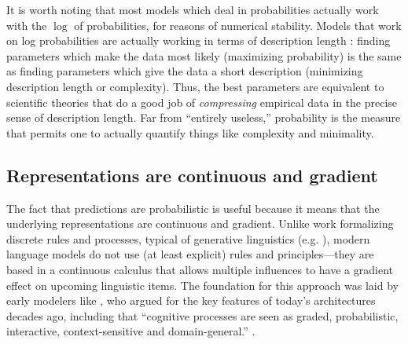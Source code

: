 \documentclass[output=paper,colorlinks,citecolor=brown
]{langscibook}
\begin{document}
It is worth noting that most models which deal in probabilities actually work with the $\log$ of probabilities, for reasons of numerical stability. Models that work on log probabilities are actually working in terms of description length \citep{shannon1948mathematical,cover1999elements}: finding parameters which make the data most likely (maximizing probability) is the same as finding parameters which give the data a short description (minimizing description length or complexity). Thus, the best parameters are equivalent to scientific theories that do a good job of \emph{compressing} empirical data in the precise sense of description length. Far from ``entirely useless,'' probability is the measure that permits one to actually quantify things like complexity and minimality. 

\subsection{Representations are continuous and gradient}

The fact that predictions are probabilistic is useful because it means that the underlying representations are continuous and gradient. Unlike work formalizing discrete rules and processes, typical of generative linguistics (e.g. \cite{chomsky1956three,chomsky1995minimalist,collins2016formalization,chomsky1957syntactic,pinker1988language}), modern language models do not use (at least explicit) rules and principles---they are based in a continuous calculus that allows multiple influences to have a gradient effect on upcoming linguistic items. The foundation for this approach was laid by early modelers like \cite{rumelhart1986learning}, who argued for the key features of today's architectures decades ago, including that ``cognitive processes are seen as graded, probabilistic, interactive, context-sensitive and domain-general.'' \citep{mcclelland2002rules}. 
\end{document}
